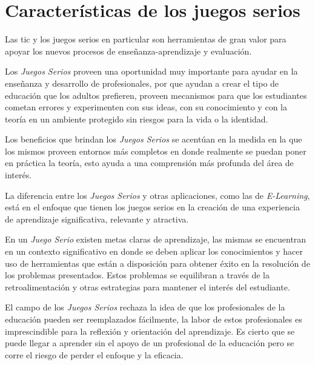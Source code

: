 \section{Características de los juegos serios}

Las \Gls{tic} y los juegos serios en particular son herramientas de gran valor
para apoyar los nuevos procesos de enseñanza-aprendizaje y
evaluación\cite{guenaga2013serious}.


Los \emph{Juegos Serios} proveen una oportunidad muy importante para ayudar en
la enseñanza y desarrollo de profesionales\cite{guenaga2013serious}, por que
ayudan a crear el tipo de educación que los adultos prefieren, proveen
mecanismos para que los estudiantes cometan errores y experimenten con sus
ideas, con su conocimiento y con la teoría en un ambiente protegido sin riesgos
para la vida o la identidad\cite{sg:aoverview,education:games}. 

Los beneficios que brindan los \emph{Juegos Serios} se acentúan en la medida en
la que los mismos proveen entornos más completos en donde realmente se puedan
poner en práctica la teoría, esto ayuda a una comprensión más profunda del área
de interés\cite{sg:aoverview}.

La diferencia entre los \emph{Juegos Serios} y otras aplicaciones, como las de
\emph{E-Learning}, está en el enfoque que tienen los juegos serios en la creación
de una experiencia de aprendizaje significativa, relevante y
atractiva\cite{sg:aoverview}.

En un \emph{Juego Serio} existen metas claras de aprendizaje, las mismas se
encuentran en un contexto significativo en donde se deben aplicar los
conocimientos y hacer uso de herramientas que están a disposición para obtener
éxito en la resolución de los problemas presentados. Estos problemas se
equilibran a través de la retroalimentación y otras estrategias para mantener el
interés del estudiante\cite{sg:aoverview}.

El campo de los \emph{Juegos Serios} rechaza la idea de que los profesionales de
la educación pueden ser reemplazados fácilmente, la labor de estos profesionales
es imprescindible para la reflexión y orientación del
aprendizaje\cite{elearning:seiousgames}. Es cierto que se puede llegar a
aprender sin el apoyo de un profesional de la educación pero se corre el riesgo
de perder el enfoque y la eficacia\cite{elearning:seiousgames}. 

